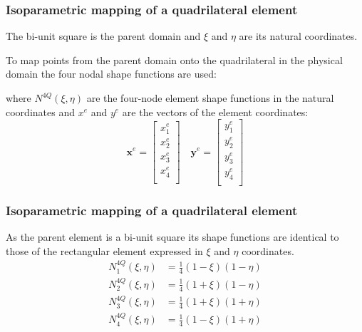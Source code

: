 \documentclass[notes]{beamer}
\begin{document}
\begin{frame}
\frametitle{Isoparametric mapping of a quadrilateral element}
The bi-unit square is the parent domain and $\xi$ and $\eta$ are its natural coordinates. 

To map points from the parent domain onto the quadrilateral in the physical domain the four nodal
shape functions are used:

	where $N^{4Q}(\xi, \eta)$ are the four-node element shape functions in the natural coordinates and $x^e$ and $y^e$ are the vectors of the element coordinates:
	\begin{equation*}
	\mathbf{x}^e = 
	\begin{bmatrix} 
	x_1^e \\
	x_2^e \\
	x_3^e \\
	x_4^e \\
	\end{bmatrix}
	\quad
	\mathbf{y}^e = 
	\begin{bmatrix} 
	y_1^e \\
	y_2^e \\
	y_3^e \\
	y_4^e \\
	\end{bmatrix}
	\end{equation*}
	
\end{frame}

\begin{frame}
\frametitle{Isoparametric mapping of a quadrilateral element}
As the parent element is a bi-unit square its shape functions are identical to those of the
rectangular element expressed in $\xi$ and $\eta$ coordinates.
\begin{align*}
	N_1^{4Q}(\xi, \eta) & = \frac{1}{4}(1-\xi)(1-\eta)\\
	N_2^{4Q}(\xi, \eta) & = \frac{1}{4}(1+\xi)(1-\eta)\\
	N_3^{4Q}(\xi, \eta) & = \frac{1}{4}(1+\xi)(1+\eta)\\
	N_4^{4Q}(\xi, \eta) & = \frac{1}{4}(1-\xi)(1+\eta)\\
\end{align*}
\end{frame}
\end{document}
